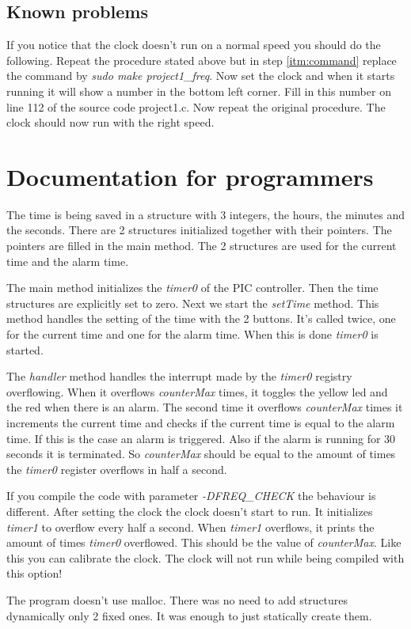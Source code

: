 \documentclass[a4]{article}
\begin{document}
\subsection{Known problems}
If you notice that the clock doesn't run on a normal speed you should do the following. Repeat the procedure stated above but in step \ref{itm:command} replace the command by \textit{sudo make project1\_freq}. Now set the clock and when it starts running it will show a number in the bottom left corner. Fill in this number on line 112 of the source code project1.c. Now repeat the original procedure. The clock should now run with the right speed.
\section{Documentation for programmers}
The time is being saved in a structure with 3 integers, the hours, the minutes and the seconds. There are 2 structures initialized together with their pointers. The pointers are filled in the main method. The 2 structures are used for the current time and the alarm time.\par
The main method initializes the \textit{timer0} of the PIC controller. Then the time structures are explicitly set to zero. Next we start the \textit{setTime} method. This method handles the setting of the time with the 2 buttons. It's called twice, one for the current time and one for the alarm time. When this is done \textit{timer0} is started.\par
The \textit{handler} method handles the interrupt made by the \textit{timer0} registry overflowing. When it overflows \textit{counterMax} times, it toggles the yellow led and the red when there is an alarm. The second time it overflows \textit{counterMax} times it increments the current time and checks if the current time is equal to the alarm time. If this is the case an alarm is triggered. Also if the alarm is running for 30 seconds it is terminated. So \textit{counterMax} should be equal to the amount of times the \textit{timer0} register overflows in half a second.\par
If you compile the code with parameter \textit{-DFREQ\_CHECK} the behaviour is different. After setting the clock the clock doesn't start to run. It initializes \textit{timer1} to overflow every half a second. When \textit{timer1} overflows, it prints the amount of times \textit{timer0} overflowed. This should be the value of \textit{counterMax}. Like this you can calibrate the clock. The clock will not run while being compiled with this option!\par
The program doesn't use malloc. There was no need to add structures dynamically only 2 fixed ones. It was enough to just statically create them.
\end{document}
